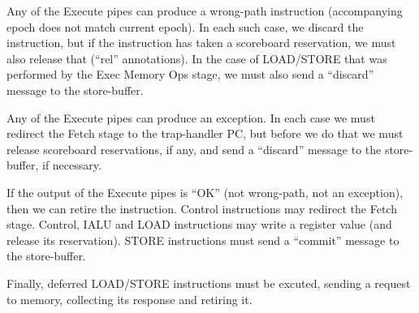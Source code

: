 Any of the Execute pipes can produce a wrong-path instruction
(accompanying epoch does not match current epoch).  In each such case,
we discard the instruction, but if the instruction has taken a
scoreboard reservation, we must also release that (``rel''
annotations).  In the case of LOAD/STORE that was performed by the
Exec Memory Ops stage, we must also send a ``discard'' message to the
store-buffer.

Any of the Execute pipes can produce an exception.  In each case we
must redirect the Fetch stage to the trap-handler PC, but before we do
that we must release scoreboard reservations, if any, and send a
``discard'' message to the store-buffer, if necessary.

If the output of the Execute pipes is ``OK'' (not wrong-path, not an
exception), then we can retire the instruction.  Control instructions
may redirect the Fetch stage.  Control, IALU and LOAD instructions may
write a register value (and release its reservation).  STORE
instructions must send a ``commit'' message to the store-buffer.

Finally, deferred LOAD/STORE instructions must be excuted, sending a
request to memory, collecting its response and retiring it.

